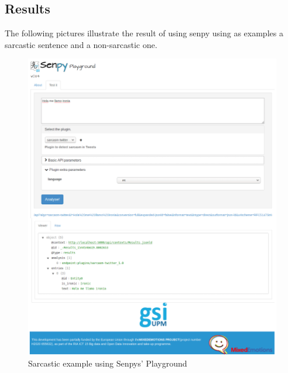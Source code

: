 \subsection{Results}
The following pictures illustrate the result of using senpy using as examples a sarcastic sentence and a non-sarcastic one.
\begin{figure}
	\includegraphics[width=\linewidth]{img/ironia.png}
	\caption{Sarcastic example using Senpys' Playground~\cite{senpy}}
	\label{fig:senpyex1}
\end{figure}
